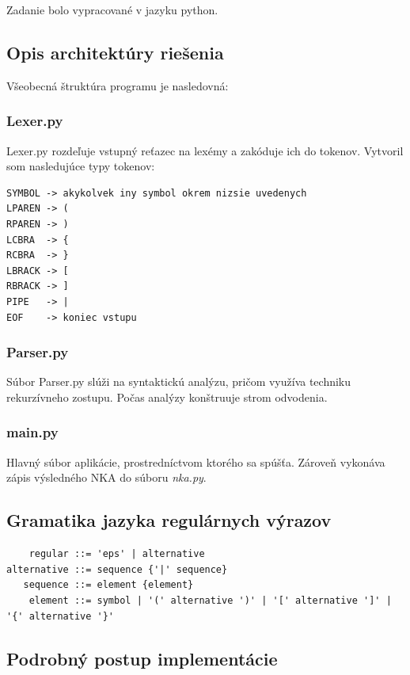 \documentclass[a4paper,12pt]{article}
\begin{document}
Zadanie bolo vypracované v jazyku python.

\subsection{Opis architektúry riešenia}
Všeobecná štruktúra programu je nasledovná:
\subsubsection{Lexer.py}
Lexer.py rozdeľuje vstupný reťazec na lexémy a zakóduje ich do tokenov.
Vytvoril som nasledujúce typy tokenov:
\lstset{basicstyle=\ttfamily}
\begin{lstlisting}
SYMBOL -> akykolvek iny symbol okrem nizsie uvedenych
LPAREN -> (
RPAREN -> )
LCBRA  -> {
RCBRA  -> }
LBRACK -> [
RBRACK -> ]
PIPE   -> |
EOF    -> koniec vstupu
\end{lstlisting}

\subsubsection{Parser.py}
Súbor Parser.py slúži na syntaktickú analýzu, pričom využíva techniku rekurzívneho zostupu.
Počas analýzy konštruuje strom odvodenia.

\subsubsection{main.py}
Hlavný súbor aplikácie, prostredníctvom ktorého sa spúšťa.
Zároveň vykonáva zápis výsledného NKA do súboru \textit{nka.py}.

\subsection{Gramatika jazyka regulárnych výrazov}

\lstset{basicstyle=\ttfamily}
\begin{lstlisting}
    regular ::= 'eps' | alternative
alternative ::= sequence {'|' sequence}
   sequence ::= element {element}
    element ::= symbol | '(' alternative ')' | '[' alternative ']' | '{' alternative '}'

\end{lstlisting}

\subsection{Podrobný postup implementácie}
\end{document}
